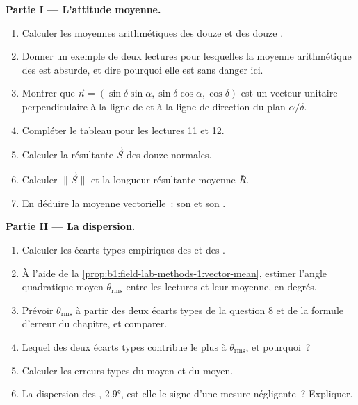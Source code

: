 \begin{problem}
\medskip
\noindent\textbf{Partie I --- L'attitude moyenne.}
\begin{enumerate}
  \item Calculer les moyennes arithmétiques des douze  et des
        douze .
  \item Donner un exemple de deux lectures pour lesquelles la moyenne
        arithmétique des  est absurde, et dire pourquoi elle est
        sans danger ici.
  \item Montrer que $\vec n = (\sin\delta\sin\alpha, \sin\delta\cos\alpha,
        \cos\delta)$ est un vecteur unitaire perpendiculaire à la ligne de
         et à la ligne de direction du plan $\alpha/\delta$.
  \item Compléter le tableau pour les lectures 11 et 12.
  \item Calculer la résultante $\vec S$ des douze normales.
  \item Calculer $\|\vec S\|$ et la longueur résultante moyenne $\bar R$.
  \item En déduire la moyenne vectorielle~: son  et son .
\end{enumerate}

\medskip
\noindent\textbf{Partie II --- La dispersion.}
\begin{enumerate}[resume]
  \item Calculer les écarts types empiriques des  et des
        .
  \item À l'aide de la \cref{prop:b1:field-lab-methods-1:vector-mean}, estimer
        l'angle quadratique moyen $\theta_{\text{rms}}$ entre les lectures et
        leur moyenne, en degrés.
  \item Prévoir $\theta_{\text{rms}}$ à partir des deux écarts types de la
        question 8 et de la formule d'erreur du chapitre, et comparer.
  \item Lequel des deux écarts types contribue le plus à
        $\theta_{\text{rms}}$, et pourquoi~?
  \item Calculer les erreurs types du  moyen et du 
        moyen.
  \item La dispersion des , \ang{2.9}, est-elle le signe d'une
        mesure négligente~? Expliquer.
\end{enumerate}


\end{problem}
